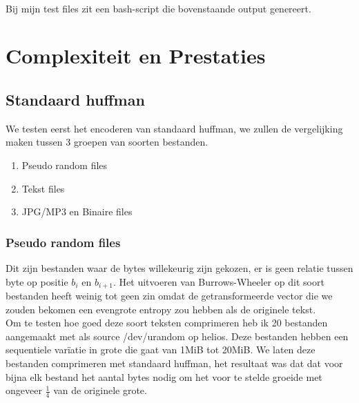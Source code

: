 \documentclass[10pt,a4paper]{report}
\begin{document}
\\
Bij mijn test files zit een bash-script die bovenstaande output genereert.  
\pagebreak
\section*{Complexiteit en Prestaties}
\subsection*{Standaard huffman}
We testen eerst het encoderen van standaard huffman, we zullen de vergelijking maken tussen 3 groepen van soorten bestanden.
\begin{enumerate}
\item Pseudo random files
\item Tekst files
\item JPG/MP3 en Binaire files
\end{enumerate}

\subsubsection*{Pseudo random files}
Dit zijn bestanden waar de bytes willekeurig zijn gekozen, er is geen relatie tussen byte op positie $b_{i}$ en $b_{i+1}$. Het uitvoeren van Burrows-Wheeler op dit soort bestanden heeft weinig tot geen zin omdat de getransformeerde vector die we zouden bekomen een evengrote entropy zou hebben als de originele tekst.\\

Om te testen hoe goed deze soort teksten comprimeren heb ik 20 bestanden aangemaakt met als source /dev/urandom op helios. Deze bestanden hebben een sequentiele var\"iatie in grote die gaat van 1MiB tot 20MiB. We laten deze bestanden comprimeren met standaard huffman, het resultaat was dat dat voor bijna elk bestand het aantal bytes nodig om het voor te stelde groeide met ongeveer $\frac{1}{4}$ van de originele grote.\\
\end{document}
